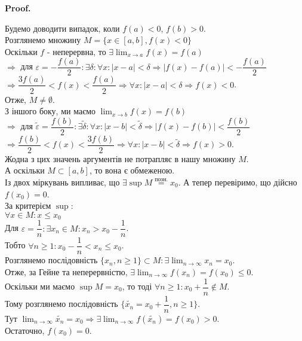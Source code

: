 \documentclass[a4paper, 14pt]{article}
\makeatletter
\def\huge{\displaystyle}
\def\qed{$\blacksquare$}
\theoremstyle{theoremdd}
\theoremstyle{theoremdd}
\theoremstyle{theoremdd}
\theoremstyle{theoremdd}
\theoremstyle{theoremdd}
\theoremstyle{theoremdd}
\theoremstyle{theoremdd}
\theoremstyle{theoremdd}
\renewenvironment{proof}[1][Proof.\\]{\par
\pushQED{\hfill \qed}%
\normalfont \topsep6\p@\@plus6\p@\relax
\trivlist
\item\relax
{\bfseries
#1\@addpunct{.}}\hspace\labelsep\ignorespaces
}{%
\popQED\endtrivlist\@endpefalse
}
\makeatother
\begin{document}
\begin{proof}
Будемо доводити випадок, коли $f(a) < 0$, $f(b) > 0$.\\
Розглянемо множину $M= \{x \in [a,b], f(x) < 0\}$\\
Оскільки $f$ - неперервна, то $\huge \exists \lim_{x \to a} f(x) = f(a)$\\
$\Rightarrow$ для $\varepsilon = -\dfrac{f(a)}{2}: \exists \delta: \forall x: |x-a|<\delta \Rightarrow |f(x)-f(a)|< -\dfrac{f(a)}{2}$\\
$\Rightarrow \dfrac{3f(a)}{2} < f(x) < \dfrac{f(a)}{2} \Rightarrow \forall x: |x-a|<\delta \Rightarrow f(x) < 0$.\\
Отже, $M \neq \emptyset$.\\
З іншого боку, ми маємо $\huge \lim_{x \to b} f(x) = f(b)$\\
$\Rightarrow$ для $\tilde{\varepsilon} = \dfrac{f(b)}{2}: \exists \tilde{\delta}: \forall x: |x-b| < \tilde{\delta} \Rightarrow |f(x)-f(b)|<\dfrac{f(b)}{2}$\\
$\Rightarrow \dfrac{f(b)}{2} < f(x) < \dfrac{3f(b)}{2} \Rightarrow \forall x: |x-b| < \tilde{\delta} \Rightarrow f(x) > 0$.\\
Жодна з цих значень аргументів не потрапляє в нашу множину $M$.\\
А оскільки $M \subset [a,b]$, то вона є обмеженою.
\bigskip \\
Із двох міркувань випливає, що $\exists \sup M \overset{\textrm{позн.}}{=} x_0$. А тепер перевіримо, що дійсно $f(x_0) = 0$.\\
За критерієм $\sup$:\\
$\forall x \in M: x \leq x_0$\\
Для $\varepsilon = \dfrac{1}{n}: \exists x_n \in M: x_n > x_0 - \dfrac{1}{n}$.\\
Тобто $\forall n \geq 1: x_0 - \dfrac{1}{n} < x_n \leq x_0$.\\
Розглянемо послідовність $\{x_n, n \geq 1\} \subset M: \exists \huge \lim_{n \to \infty} x_n = x_0$.\\
Отже, за Гейне та неперервністю, $\huge \exists \lim_{n \to \infty} f(x_n) = f(x_0) \leq 0$.
\\
Оскільки ми маємо $\sup M = x_0$, то тоді $\forall n \geq 1: x_0 + \dfrac{1}{n} \not\in M$.\\
Тому розглянемо послідовність $\{\tilde{x_n} = x_0 + \dfrac{1}{n}, n \geq 1\}$.\\
Тут $\huge \lim_{n \to \infty} \tilde{x_n} = x_0 \Rightarrow \exists \lim_{n \to \infty} f(\tilde{x_n}) = f(x_0) > 0$.\\
Остаточно, $f(x_0) = 0$.
\end{proof}
\end{document}
